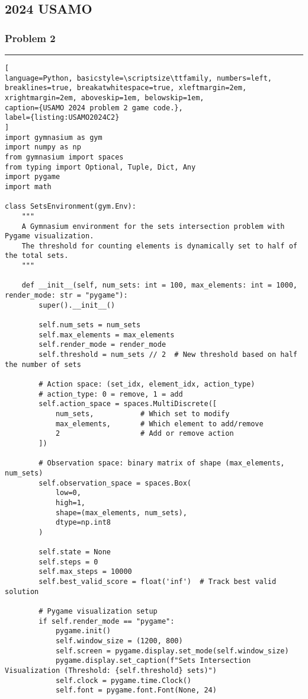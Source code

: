 \subsection*{2024 USAMO}
\label{appendix:H_2024_USAMO}

\subsubsection*{Problem 2}

\hrule
\begin{lstlisting}[
language=Python, basicstyle=\scriptsize\ttfamily, numbers=left, breaklines=true, breakatwhitespace=true, xleftmargin=2em, xrightmargin=2em, aboveskip=1em, belowskip=1em,
caption={USAMO 2024 problem 2 game code.},
label={listing:USAMO2024C2}
]
import gymnasium as gym
import numpy as np
from gymnasium import spaces
from typing import Optional, Tuple, Dict, Any
import pygame
import math

class SetsEnvironment(gym.Env):
    """
    A Gymnasium environment for the sets intersection problem with Pygame visualization.
    The threshold for counting elements is dynamically set to half of the total sets.
    """
    
    def __init__(self, num_sets: int = 100, max_elements: int = 1000, render_mode: str = "pygame"):
        super().__init__()
        
        self.num_sets = num_sets
        self.max_elements = max_elements
        self.render_mode = render_mode
        self.threshold = num_sets // 2  # New threshold based on half the number of sets
        
        # Action space: (set_idx, element_idx, action_type)
        # action_type: 0 = remove, 1 = add
        self.action_space = spaces.MultiDiscrete([
            num_sets,           # Which set to modify
            max_elements,       # Which element to add/remove
            2                   # Add or remove action
        ])
        
        # Observation space: binary matrix of shape (max_elements, num_sets)
        self.observation_space = spaces.Box(
            low=0,
            high=1,
            shape=(max_elements, num_sets),
            dtype=np.int8
        )
        
        self.state = None
        self.steps = 0
        self.max_steps = 10000
        self.best_valid_score = float('inf')  # Track best valid solution
        
        # Pygame visualization setup
        if self.render_mode == "pygame":
            pygame.init()
            self.window_size = (1200, 800)
            self.screen = pygame.display.set_mode(self.window_size)
            pygame.display.set_caption(f"Sets Intersection Visualization (Threshold: {self.threshold} sets)")
            self.clock = pygame.time.Clock()
            self.font = pygame.font.Font(None, 24)
            

\end{lstlisting}
